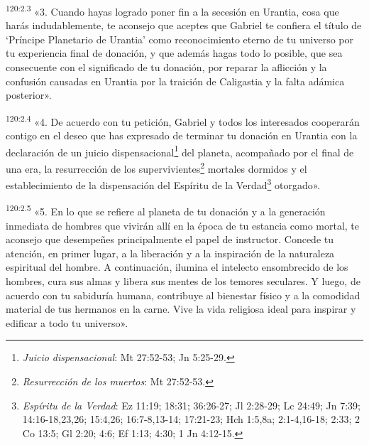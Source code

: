 \par
\textsuperscript{120:2.3} «3. Cuando hayas logrado poner fin a la secesión en Urantia, cosa que harás indudablemente, te aconsejo que aceptes que Gabriel te confiera el título de `Príncipe Planetario de Urantia' como reconocimiento eterno de tu universo por tu experiencia final de donación, y que además hagas todo lo posible, que sea consecuente con el significado de tu donación, por reparar la aflicción y la confusión causadas en Urantia por la traición de Caligastia y la falta adámica posterior».

\par
\textsuperscript{120:2.4} «4. De acuerdo con tu petición, Gabriel y todos los interesados cooperarán contigo en el deseo que has expresado de terminar tu donación en Urantia con la declaración de un juicio dispensacional\footnote{\textit{Juicio dispensacional}: Mt 27:52-53; Jn 5:25-29.} del planeta, acompañado por el final de una era, la resurrección de los supervivientes\footnote{\textit{Resurrección de los muertos}: Mt 27:52-53.} mortales dormidos y el establecimiento de la dispensación del Espíritu de la Verdad\footnote{\textit{Espíritu de la Verdad}: Ez 11:19; 18:31; 36:26-27; Jl 2:28-29; Lc 24:49; Jn 7:39; 14:16-18,23,26; 15:4,26; 16:7-8,13-14; 17:21-23; Hch 1:5,8a; 2:1-4,16-18; 2:33; 2 Co 13:5; Gl 2:20; 4:6; Ef 1:13; 4:30; 1 Jn 4:12-15.} otorgado».

\par
\textsuperscript{120:2.5} «5. En lo que se refiere al planeta de tu donación y a la generación inmediata de hombres que vivirán allí en la época de tu estancia como mortal, te aconsejo que desempeñes principalmente el papel de instructor. Concede tu atención, en primer lugar, a la liberación y a la inspiración de la naturaleza espiritual del hombre. A continuación, ilumina el intelecto ensombrecido de los hombres, cura sus almas y libera sus mentes de los temores seculares. Y luego, de acuerdo con tu sabiduría humana, contribuye al bienestar físico y a la comodidad material de tus hermanos en la carne. Vive la vida religiosa ideal para inspirar y edificar a todo tu universo».

